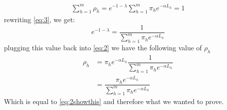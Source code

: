 \documentclass{article}
\begin{document}
\begin{align}
\sum\limits_{h=1}^m \rho_h = e^{-1-\lambda} \sum\limits_{h=1}^m \pi_h e^{-\alpha L_h} = 1
\label{eq:3}
\end{align}
rewriting \eqref{eq:3}, we get:
\begin{equation}
e^{-1-\lambda} = \dfrac{1}{\sum_{h=1}^m \pi_h e^{-\alpha L_h}}
\end{equation}
plugging this value back into \eqref{eq:2} we have the following value of $\rho_h$
\begin{align}
\rho_h &= \pi_h e^{-\alpha L_h} \dfrac{1}{\sum_{h=1}^m \pi_h e^{-\alpha L_h}} \\
&= \dfrac{\pi_h e^{-\alpha L_h}}{\sum_{h=1}^m \pi_h e^{-\alpha L_h}}
\end{align}
Which is equal to \eqref{eq:2showthis} and therefore what we wanted to prove.
\end{document}
